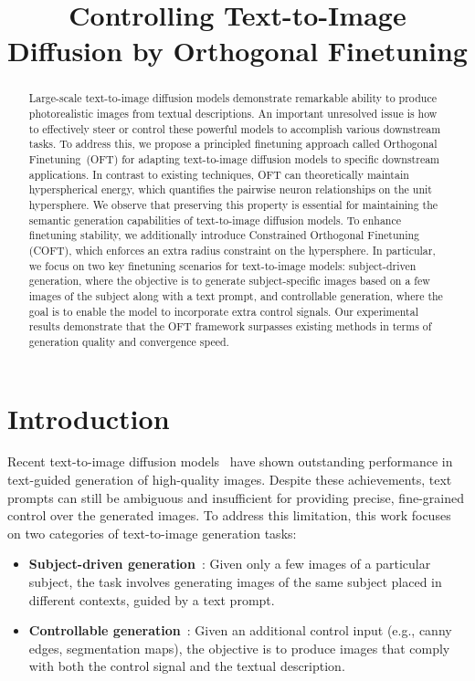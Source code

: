 \title{Controlling Text-to-Image Diffusion by Orthogonal Finetuning}

\begin{abstract}
Large-scale text-to-image diffusion models demonstrate remarkable ability to produce photorealistic images from textual descriptions. An important unresolved issue is how to effectively steer or control these powerful models to accomplish various downstream tasks. To address this, we propose a principled finetuning approach called Orthogonal Finetuning~(OFT) for adapting text-to-image diffusion models to specific downstream applications. In contrast to existing techniques, OFT can theoretically maintain hyperspherical energy, which quantifies the pairwise neuron relationships on the unit hypersphere. We observe that preserving this property is essential for maintaining the semantic generation capabilities of text-to-image diffusion models. To enhance finetuning stability, we additionally introduce Constrained Orthogonal Finetuning (COFT), which enforces an extra radius constraint on the hypersphere. In particular, we focus on two key finetuning scenarios for text-to-image models: subject-driven generation, where the objective is to generate subject-specific images based on a few images of the subject along with a text prompt, and controllable generation, where the goal is to enable the model to incorporate extra control signals. Our experimental results demonstrate that the OFT framework surpasses existing methods in terms of generation quality and convergence speed.
\end{abstract}

\section{Introduction}

Recent text-to-image diffusion models~\cite{saharia2022photorealistic,ramesh2022hierarchical,rombach2022high} have shown outstanding performance in text-guided generation of high-quality images. Despite these achievements, text prompts can still be ambiguous and insufficient for providing precise, fine-grained control over the generated images. To address this limitation, this work focuses on two categories of text-to-image generation tasks:

\begin{itemize}[leftmargin=*,nosep]

    \item \textbf{Subject-driven generation}~\cite{ruiz2023dreambooth}: Given only a few images of a particular subject, the task involves generating images of the same subject placed in different contexts, guided by a text prompt.
    \item \textbf{Controllable generation}~\cite{zhang2023adding,mou2023t2i}: Given an additional control input (e.g., canny edges, segmentation maps), the objective is to produce images that comply with both the control signal and the textual description.
\end{itemize}

